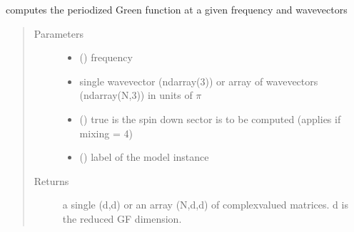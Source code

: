 \documentclass[letterpaper,10pt,english]{sphinxmanual}
\begin{document}

\begin{fulllineitems}
\label{\detokenize{functions:pyqcm.periodized_Green_function}}
\sphinxAtStartPar
computes the periodized Green function at a given frequency and wavevectors
\begin{quote}\begin{description}
\item[{Parameters}] \leavevmode\begin{itemize}
\item {} 
\sphinxAtStartPar
{} () \textendash{} frequency

\item {} 
\sphinxAtStartPar
{} \textendash{} single wavevector (ndarray(3)) or array of wavevectors (ndarray(N,3)) in units of \(\pi\)

\item {} 
\sphinxAtStartPar
{} () \textendash{} true is the spin down sector is to be computed (applies if mixing = 4)

\item {} 
\sphinxAtStartPar
{} () \textendash{} label of the model instance

\end{itemize}

\item[{Returns}] \leavevmode
\sphinxAtStartPar
a single (d,d) or an array (N,d,d) of complex\sphinxhyphen{}valued matrices. d is the reduced GF dimension.

\end{description}\end{quote}

\end{fulllineitems}
\end{document}
